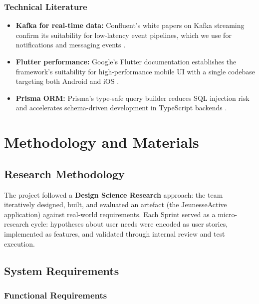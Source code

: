 \documentclass[12pt,a4paper]{report}
\begin{document}
\subsection{Technical Literature}
\begin{itemize}
  \item \textbf{Kafka for real-time data:} Confluent's white papers on Kafka streaming confirm its suitability for low-latency event pipelines, which we use for notifications and messaging events \cite{kafka2021}.
  \item \textbf{Flutter performance:} Google's Flutter documentation establishes the framework's suitability for high-performance mobile UI with a single codebase targeting both Android and iOS \cite{flutter2023}.
  \item \textbf{Prisma ORM:} Prisma's type-safe query builder reduces SQL injection risk and accelerates schema-driven development in TypeScript backends \cite{prisma2024}.
\end{itemize}

\chapter{Methodology and Materials}

\section{Research Methodology}

The project followed a \textbf{Design Science Research} approach: the team iteratively designed, built, and evaluated an artefact (the JeunesseActive application) against real-world requirements. Each Sprint served as a micro-research cycle: hypotheses about user needs were encoded as user stories, implemented as features, and validated through internal review and test execution.

\section{System Requirements}

\subsection{Functional Requirements}
\end{document}
